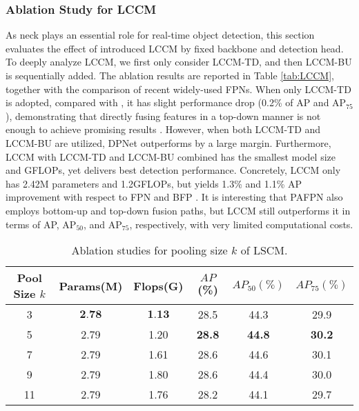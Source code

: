 \documentclass[lettersize,journal]{IEEEtran}
\begin{document}
\subsubsection{Ablation Study for LCCM}
As neck plays an essential role for real-time object detection, this section evaluates the effect of introduced LCCM by fixed backbone and detection head. To deeply analyze LCCM, we first only consider LCCM-TD, and then LCCM-BU is sequentially added. The ablation results are reported in Table \ref{tab:LCCM}, together with the comparison of recent widely-used FPNs. When only LCCM-TD is adopted, compared with \cite{guo2020augfpn}, it has slight performance drop (0.2\% of AP and AP$_{75}$), demonstrating that directly fusing features in a top-down manner is not enough to achieve promising results \cite{tan2020efficientdet}. However, when both LCCM-TD and LCCM-BU are utilized, DPNet outperforms \cite{guo2020augfpn} by a large margin. Furthermore, LCCM with LCCM-TD and LCCM-BU combined has the smallest model size and GFLOPs, yet delivers best detection performance. Concretely, LCCM only has 2.42M parameters and 1.2GFLOPs, but yields 1.3\% and 1.1\% AP improvement with respect to FPN \cite{lin2017feature} and BFP \cite{pang2019libra}. It is interesting that PAFPN \cite{tan2020efficientdet} also employs bottom-up and top-down fusion paths, but LCCM still outperforms it in terms of AP, AP$_{50}$, and AP$_{75}$, respectively, with very limited computational costs.



\begin{table}[t!] 
	\tabcolsep 1.1mm \caption{Ablation studies for pooling size $k$ of LSCM.} 
	\begin{center}
		\begin{tabular}{c|c|c|c|c|c}
			\toprule \multirow{1}{*}{Pool Size $k$} &\multirow{1}{*}{Params(M)}  & \multirow{1}{*}{Flops(G)}& \multirow{1}{*}{$AP$(\%)}& \multirow{1}{*}{$AP_{50}(\%)$}& \multirow{1}{*}{$AP_{75}(\%)$}\\ \midrule
			3 &$\textbf{2.78}$ &$\textbf{1.13}$ &28.5 &44.3 &29.9 \\
5 &2.79 &1.20 &\textbf{28.8} &\textbf{44.8} &\textbf{30.2} \\
7  &2.79 &1.61 &28.6 &44.6 &30.1 \\
9  &2.79 &1.80 &28.6 &44.4 &30.0 \\
			11 &2.79 &1.76 &28.2 &44.1 &29.7 \\
\bottomrule
		\end{tabular}\label{tab:poolsize}
	\end{center}	
\end{table} 
\end{document}

